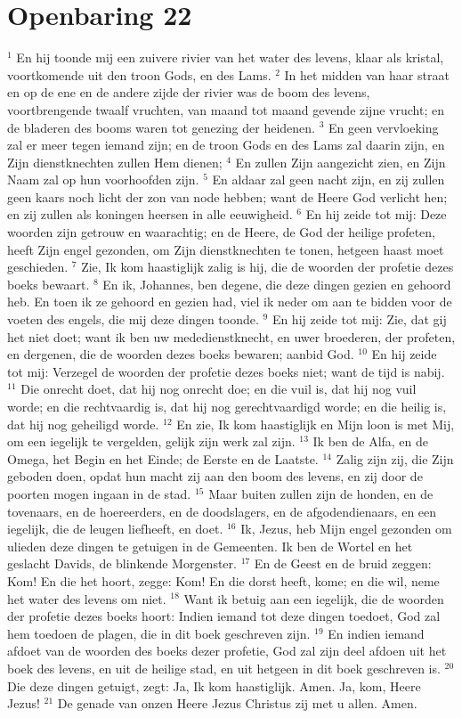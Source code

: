 \documentclass[fontsize=11pt,paper=a5,pagesize=auto]{scrbook}
\begin{document}
\chapter{Openbaring 22}
$^{1}$ En hij toonde mij een zuivere rivier van het water des levens, klaar als kristal, voortkomende uit den troon Gods, en des Lams. $^{2}$ In het midden van haar straat en op de ene en de andere zijde der rivier was de boom des levens, voortbrengende twaalf vruchten, van maand tot maand gevende zijne vrucht; en de bladeren des booms waren tot genezing der heidenen. $^{3}$ En geen vervloeking zal er meer tegen iemand zijn; en de troon Gods en des Lams zal daarin zijn, en Zijn dienstknechten zullen Hem dienen; $^{4}$ En zullen Zijn aangezicht zien, en Zijn Naam zal op hun voorhoofden zijn. $^{5}$ En aldaar zal geen nacht zijn, en zij zullen geen kaars noch licht der zon van node hebben; want de Heere God verlicht hen; en zij zullen als koningen heersen in alle eeuwigheid. $^{6}$ En hij zeide tot mij: Deze woorden zijn getrouw en waarachtig; en de Heere, de God der heilige profeten, heeft Zijn engel gezonden, om Zijn dienstknechten te tonen, hetgeen haast moet geschieden. $^{7}$ Zie, Ik kom haastiglijk zalig is hij, die de woorden der profetie dezes boeks bewaart. $^{8}$ En ik, Johannes, ben degene, die deze dingen gezien en gehoord heb. En toen ik ze gehoord en gezien had, viel ik neder om aan te bidden voor de voeten des engels, die mij deze dingen toonde. $^{9}$ En hij zeide tot mij: Zie, dat gij het niet doet; want ik ben uw mededienstknecht, en uwer broederen, der profeten, en dergenen, die de woorden dezes boeks bewaren; aanbid God. $^{10}$ En hij zeide tot mij: Verzegel de woorden der profetie dezes boeks niet; want de tijd is nabij. $^{11}$ Die onrecht doet, dat hij nog onrecht doe; en die vuil is, dat hij nog vuil worde; en die rechtvaardig is, dat hij nog gerechtvaardigd worde; en die heilig is, dat hij nog geheiligd worde. $^{12}$ En zie, Ik kom haastiglijk en Mijn loon is met Mij, om een iegelijk te vergelden, gelijk zijn werk zal zijn. $^{13}$ Ik ben de Alfa, en de Omega, het Begin en het Einde; de Eerste en de Laatste. $^{14}$ Zalig zijn zij, die Zijn geboden doen, opdat hun macht zij aan den boom des levens, en zij door de poorten mogen ingaan in de stad. $^{15}$ Maar buiten zullen zijn de honden, en de tovenaars, en de hoereerders, en de doodslagers, en de afgodendienaars, en een iegelijk, die de leugen liefheeft, en doet. $^{16}$ Ik, Jezus, heb Mijn engel gezonden om ulieden deze dingen te getuigen in de Gemeenten. Ik ben de Wortel en het geslacht Davids, de blinkende Morgenster. $^{17}$ En de Geest en de bruid zeggen: Kom! En die het hoort, zegge: Kom! En die dorst heeft, kome; en die wil, neme het water des levens om niet. $^{18}$ Want ik betuig aan een iegelijk, die de woorden der profetie dezes boeks hoort: Indien iemand tot deze dingen toedoet, God zal hem toedoen de plagen, die in dit boek geschreven zijn. $^{19}$ En indien iemand afdoet van de woorden des boeks dezer profetie, God zal zijn deel afdoen uit het boek des levens, en uit de heilige stad, en uit hetgeen in dit boek geschreven is. $^{20}$ Die deze dingen getuigt, zegt: Ja, Ik kom haastiglijk. Amen. Ja, kom, Heere Jezus! $^{21}$ De genade van onzen Heere Jezus Christus zij met u allen. Amen.
\chapter{}
$^{}$ 
\end{document}
